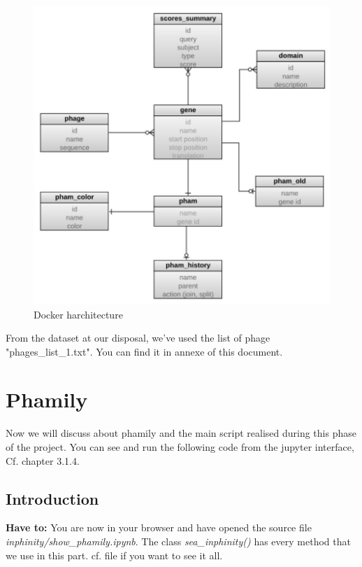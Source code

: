 \documentclass[a4paper,11pt]{report}
\begin{document}
\begin{figure}[H] 
	\begin{center}
		\includegraphics[scale=0.52]{img/12859_2011_Article_4954_Fig1_HTML}
		\caption{Docker harchitecture}
	\end{center}
\end{figure}

From the dataset at our disposal, we've used the list of phage "phages\_list\_1.txt". You can find it in annexe of this document.


\section{Phamily}
Now we will discuss about phamily and the main script realised during this phase of the project. You can see and run the following code from the jupyter interface, Cf. chapter 3.1.4.

\subsection{Introduction}

\textbf{Have to:} You are now in your browser and have opened the source file \textit{inphinity/show\_phamily.ipynb}. The class \textit{sea\_inphinity()} has every method that we use in this part. cf. file if you want to see it all.
\end{document}
